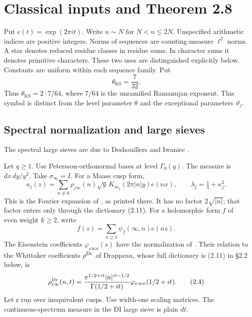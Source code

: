 \section{Classical inputs and Theorem 2.8}\label{p1:sec:classical-inputs}

Put $e(t)=\exp(2\pi i t)$. Write $n\sim N$ for $N<n\leq2N$. Unspecified arithmetic indices are positive integers. Norms of sequences are counting-measure $\ell^2$ norms. A star denotes reduced residue classes in residue sums. In character sums it denotes primitive characters. These two uses are distinguished explicitly below. Constants are uniform within each sequence family. Put
\[
 \theta_{\mathrm{KS}}=\frac7{32}.
\tag{2.1}\label{p1:eq:2.1}
\]
Thus $\theta_{\mathrm{KS}}=2\cdot7/64$, where $7/64$ is the unramified Ramanujan exponent. This symbol is distinct from the level parameter $\theta$ and the exceptional parameters $\vartheta_j$.

\subsection{Spectral normalization and large sieves}

The spectral large sieves are due to Deshouillers and Iwaniec \cite{DI82}.

Let $q\geq1$. Use Petersson-orthonormal bases at level $\Gamma_0(q)$. The measure is $dx\,dy/y^2$. Take $\sigma_\infty=I$. For a Maass cusp form,
\[
 u_j(z)=\sum_{n\ne0}\rho_{j\infty}(n)\sqrt y\,
 K_{i\kappa_j}(2\pi|n|y)e(nx),\qquad
 \lambda_j=\tfrac14+\kappa_j^2.
\tag{2.2}\label{p1:eq:2.2}
\]
This is the Fourier expansion of \cite[(1.15)]{DI82}, as printed there.
It has no factor $2\sqrt{|n|}$; that factor enters only through the dictionary (2.11).
For a holomorphic form $f$ of even weight $k\geq2$, write
\[
 f(z)=\sum_{n\geq1}\psi_f(\infty,n)e(nz).
\tag{2.3}\label{p1:eq:2.3}
\]
The Eisenstein coefficients $\varphi_{\mathfrak c\infty n}(s)$ have the normalization of \cite[(1.17)]{DI82}. Their relation to the Whittaker coefficients $\rho^{\rm Dr}$ of Drappeau, whose full dictionary is (2.11) in \S2.2 below, is
\[
 \rho^{\rm Dr}_{\mathfrak c\infty}(n,t)
 =\frac{\pi^{1/2+it}|n|^{it-1/2}}{\Gamma(1/2+it)}
   \varphi_{\mathfrak c\infty n}(1/2+it).
\tag{2.4}\label{p1:eq:2.4}
\]
Let $\mathfrak c$ run over inequivalent cusps. Use width-one scaling matrices. The continuous-spectrum measure in the DI large sieve is plain $dt$.

